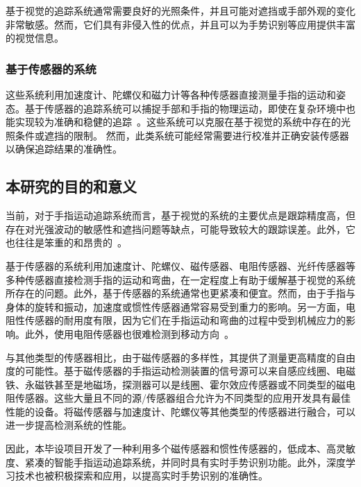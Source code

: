 基于视觉的追踪系统通常需要良好的光照条件，并且可能对遮挡或手部外观的变化非常敏感。然而，它们具有非侵入性的优点，并且可以为手势识别等应用提供丰富的视觉信息。
\subsubsection{基于传感器的系统}

这些系统利用加速度计、陀螺仪和磁力计等各种传感器直接测量手指的运动和姿态。基于传感器的追踪系统可以捕捉手部和手指的物理运动，即使在复杂环境中也能实现较为准确和稳健的追踪~\cite{introArticle3}。这些系统可以克服在基于视觉的系统中存在的光照条件或遮挡的限制。
然而，此类系统可能经常需要进行校准并正确安装传感器以确保追踪结果的准确性。

\subsection{本研究的目的和意义}
当前，对于手指运动追踪系统而言，基于视觉的系统的主要优点是跟踪精度高，但存在对光强波动的敏感性和遮挡问题等缺点，可能导致较大的跟踪误差。此外，它也往往是笨重的和昂贵的~\cite{introArticle5}。

基于传感器的系统利用加速度计、陀螺仪、磁传感器、电阻传感器、光纤传感器等多种传感器直接检测手指的运动和弯曲，在一定程度上有助于缓解基于视觉的系统所存在的问题。此外，基于传感器的系统通常也更紧凑和便宜。然而，由于手指与身体的旋转和振动，加速度或惯性传感器通常容易受到重力的影响。另一方面，电阻性传感器的耐用度有限，因为它们在手指运动和弯曲的过程中受到机械应力的影响。此外，使用电阻传感器也很难检测到移动方向~\cite{introArticle6}。

与其他类型的传感器相比，由于磁传感器的多样性，其提供了测量更高精度的自由度的可能性。基于磁传感器的手指运动检测装置的信号源可以来自感应线圈、电磁铁、永磁铁甚至是地磁场，探测器可以是线圈、霍尔效应传感器或不同类型的磁电阻传感器。这些大量且不同的源/传感器组合允许为不同类型的应用开发具有最佳性能的设备。将磁传感器与加速度计、陀螺仪等其他类型的传感器进行融合，可以进一步提高检测系统的性能。

因此，本毕设项目开发了一种利用多个磁传感器和惯性传感器的，低成本、高灵敏度、紧凑的智能手指运动追踪系统，并同时具有实时手势识别功能。此外，深度学习技术也被积极探索和应用，以提高实时手势识别的准确性。
